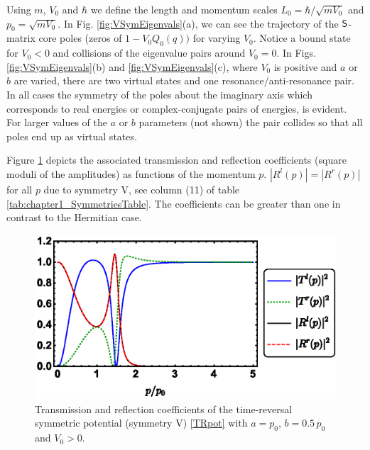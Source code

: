 Using $m$, $V_0$ and $\hbar$ we define the length and momentum scales $L_0 = \hbar/\sqrt{mV_0}$ and $p_0 = \sqrt{mV_0}$. In Fig. \ref{fig:VSymEigenvals}(a), we can see the trajectory of the ${\sf S}$-matrix core poles (zeros
of $1-V_0Q_0(q))$ for varying $V_0$. Notice a bound state for $V_0<0$ and collisions of the eigenvalue pairs around $V_0 = 0$. In Figs. \ref{fig:VSymEigenvals}(b) and \ref{fig:VSymEigenvals}(c), where $V_0$ is positive and $a$ or $b$ are varied,
there are two virtual states and one resonance/anti-resonance pair. In all cases the symmetry of the poles about the imaginary axis
which corresponds to real energies or complex-conjugate pairs of energies, is evident. For larger values of the $a$ or $b$ parameters
(not shown)
the pair collides so that all poles end up as virtual states.

Figure \ref{fig:VSymScattAmplitudes} depicts the associated transmission and reflection coefficients (square moduli of the amplitudes) as functions of the momentum $p$. $|R^l(p)|=|R^r(p)|$ for all $p$ due to symmetry V, see column (11) of table \ref{tab:chapter1_SymmetriesTable}. The coefficients can be greater than one in contrast to the Hermitian case.

\begin{figure}
\begin{center}
	\includegraphics[width=0.75\linewidth]{Figures/VSymScattAmplitudes.eps}
\end{center}
\caption{Transmission and reflection coefficients of the time-reversal symmetric potential (symmetry V) \eqref{TRpot} with $a=p_0$, $b= 0.5\, p_0$ and $V_0>0$.}
\label{fig:VSymScattAmplitudes}
\end{figure}

%
